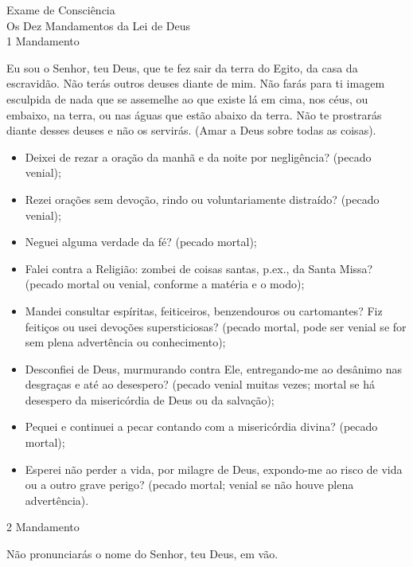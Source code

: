 \newpage
\begin{center}
    Exame de Consciência \\
    \hfill{} \break{}
    \textcolor{VioletRed2}{Os Dez Mandamentos da Lei de Deus} \\
    \hfill{} \break{}
    1\textordmasculine{} Mandamento
\end{center}
\begin{flushleft}
    Eu sou o Senhor, teu Deus, que te fez sair da terra do Egito, da casa da escravidão. Não terás outros deuses diante de mim. Não farás para ti imagem esculpida de nada que se assemelhe ao que existe lá em cima, nos céus, ou embaixo, na terra, ou nas águas que estão abaixo da terra. Não te prostrarás diante desses deuses e não os servirás. (Amar a Deus sobre todas as coisas). \\
\end{flushleft}
\begin{itemize}
    \item Deixei de rezar a oração da manhã e da noite por negligência? (pecado venial);
    \item Rezei orações sem devoção, rindo ou voluntariamente distraído? (pecado venial);
    \item Neguei alguma verdade da fé? (pecado mortal);
    \item Falei contra a Religião: zombei de coisas santas, p.ex., da Santa Missa? (pecado mortal ou venial, conforme a matéria e o modo);
    \item Mandei consultar espíritas, feiticeiros, benzendouros ou cartomantes? Fiz feitiços ou usei devoções supersticiosas? (pecado mortal, pode ser venial se for sem plena advertência ou conhecimento);
    \item Desconfiei de Deus, murmurando contra Ele, entregando-me ao desânimo nas desgraças e até ao desespero? (pecado venial muitas vezes; mortal se há desespero da misericórdia de Deus ou da salvação);
    \item Pequei e continuei a pecar contando com a misericórdia divina? (pecado mortal);
    \item Esperei não perder a vida, por milagre de Deus, expondo-me ao risco de vida ou a outro grave perigo? (pecado mortal; venial se não houve plena advertência).
\end{itemize}
\newpage
\begin{center}
    2\textordmasculine{} Mandamento
\end{center}
\begin{flushleft}
    Não pronunciarás o nome do Senhor, teu Deus, em vão.
\end{flushleft}
